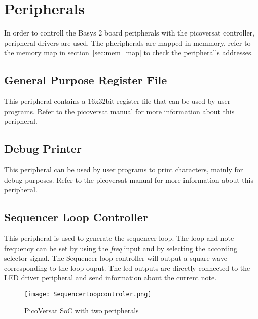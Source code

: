 \section{Peripherals}
\label{sec:periphs}

In order to controll the Basys 2 board peripherals with the picoversat controller, peripheral drivers are used. The pheripherals are mapped in memmory, refer to the memory map in section~\ref{sec:mem_map} to check the peripheral's addresses.

\subsection{General Purpose Register File}

This peripheral contains a 16x32bit register file that can be used by user
programs. Refer to the picoversat manual for more information about this peripheral. 

\subsection{Debug Printer}

This peripheral can be used by user programs to print characters, mainly for
debug purposes. Refer to the picoversat manual for more information about this peripheral.

\subsection{Sequencer Loop Controller}

This peripheral is used to generate the sequencer loop. The loop and note frequency can be set by using the \textit{freq} input and by selecting the according selector signal.
The Sequencer loop controller will output a square wave corresponding to the loop ouput. The led outputs are directly connected to the LED driver peripheral and send information about the current note. 

\begin{figure}[!htbp]
    \centerline{\texttt{[image: SequencerLoopcontroler.png]}}
    \vspace{0cm}\caption{PicoVersat SoC with two peripherals}
    \label{fig:periphs}
\end{figure}

